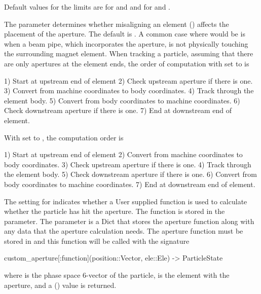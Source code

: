 Default values for the limits are  for  and  and 
 for  and .

The  parameter determines whether misaligning an element 
() affects the placement of the aperture. The default is . 
A common case where  would be  is when a beam pipe,
which incorporates the aperture, is not physically touching the surrounding magnet element. 
When tracking a particle, assuming that there are only apertures at the element ends, 
the order of computation with  set to  is
\begin{example}
  1) Start at upstream end of element
  2) Check upstream aperture if there is one.
  3) Convert from machine coordinates to body coordinates.
  4) Track through the element body.
  5) Convert from body coordinates to machine coordinates.
  6) Check downstream aperture if there is one.
  7) End at downstream end of element.
\end{example}
With  set to , the computation order is 
\begin{example}
  1) Start at upstream end of element
  2) Convert from machine coordinates to body coordinates.
  3) Check upstream aperture if there is one.
  4) Track through the element body.
  5) Check downstream aperture if there is one.
  6) Convert from body coordinates to machine coordinates.
  7) End at downstream end of element.
\end{example}

The  setting for  indicates whether a User supplied function
is used to calculate whether the particle has hit the aperture. The function is stored
in the  parameter. The  parameter is a Dict that stores
the aperture function along with any data that the aperture calculation needs. The aperture
function must be stored in  and this function will be
called with the signature
\begin{example} %
  custom_aperture[:function](position::Vector, ele::Ele) -> ParticleState
\end{example}
where  is the phase space 6-vector of the particle,  is the element 
with the aperture, and a  () value is returned.

